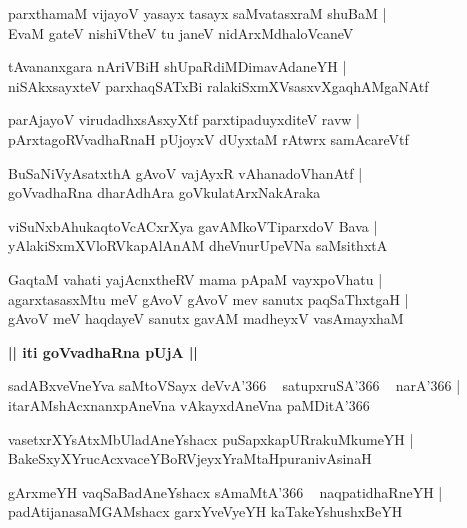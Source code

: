 \documentclass[twoside,12pt,openright]{book}
\newcounter{shloka}[chapter]
\def\uvaca#1{\centerline{{\large\textbf{#1}}}}
\begin{document}
\begin{shloka}%
parxthamaM vijayoV yasayx tasayx saMvatasxraM shuBaM |\\
EvaM gateV nishiVtheV tu janeV nidArxMdhaloVcaneV 
\end{shloka}

\begin{shloka}%
tAvananxgara nAriVBiH shUpaRdiMDimavAdaneYH |\\
niSAkxsayxteV parxhaqSATxBi ralakiSxmXVsasxvXgaqhAMgaNAtf
\end{shloka}

\begin{shloka}%
parAjayoV virudadhxsAsxyXtf parxtipaduyxditeV ravw |\\
pArxtagoRVvadhaRnaH pUjoyxV dUyxtaM rAtwrx samAcareVtf
\end{shloka}

\begin{shloka}%
BuSaNiVyAsatxthA gAvoV vajAyxR vAhanadoVhanAtf |\\
goVvadhaRna dharAdhAra goVkulatArxNakAraka
\end{shloka}

\begin{shloka}%
viSuNxbAhukaqtoVcACxrXya gavAMkoVTiparxdoV Bava |\\
yAlakiSxmXVloRVkapAlAnAM dheVnurUpeVNa saMsithxtA 
\end{shloka}

\begin{shloka}%
GaqtaM vahati yajAcnxtheRV mama pApaM vayxpoVhatu |\\
agarxtasasxMtu meV gAvoV gAvoV mev sanutx paqSaThxtgaH |\\
gAvoV meV haqdayeV sanutx gavAM madheyxV vasAmayxhaM 
\end{shloka}

\uvaca{|| iti goVvadhaRna pUjA ||}

\begin{shloka}%
sadABxveVneYva saMtoVSayx deVvA\char'366 ~ satupxruSA\char'366 ~ narA\char'366 |\\
itarAMshAcxnanxpAneVna vAkayxdAneVna paMDitA\char'366
\end{shloka}

\begin{shloka}%
vasetxrXYsAtxMbUladAneYshacx puSapxkapURrakuMkumeYH |\\
BakeSxyXYrucAcxvaceYBoRVjeyxYraMtaHpuranivAsinaH 
\end{shloka}

\begin{shloka}%
gArxmeYH vaqSaBadAneYshacx sAmaMtA\char'366 ~ naqpatidhaRneYH |\\
padAtijanasaMGAMshacx garxYveVyeYH kaTakeYshushxBeYH
\end{shloka}
\end{document}
